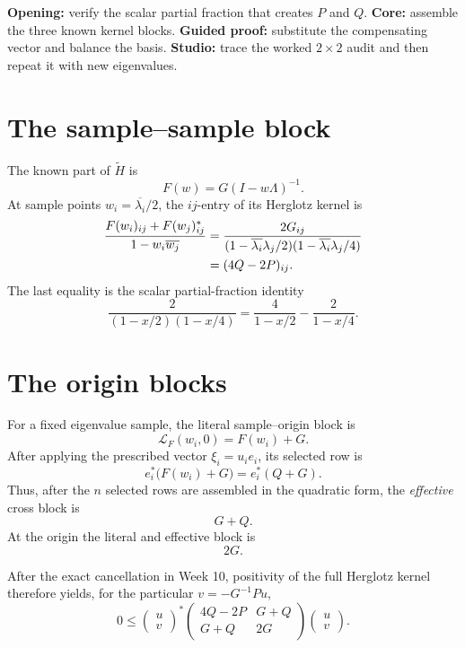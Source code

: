 \documentclass[11pt,oneside,openany]{book}
\theoremstyle{definition}
\theoremstyle{remark}
\begin{document}
\begin{workshopplan}
\textbf{Opening:} verify the scalar partial fraction that creates
\(P\) and \(Q\). \textbf{Core:} assemble the three known kernel
blocks. \textbf{Guided proof:} substitute the compensating vector and
balance the basis. \textbf{Studio:} trace the worked \(2\times2\)
audit and then repeat it with new eigenvalues.
\end{workshopplan}

\section{The sample--sample block}

The known part of \(\widetilde H\) is
\[
  F(w)=G(I-w\Lambda)^{-1}.
\]
At sample points \(w_i=\overline{\lambda_i}/2\), the \(ij\)-entry of
its Herglotz kernel is
\begin{align}
  \frac{F(w_i)_{ij}+F(w_j)^*_{ij}}
       {1-w_i\overline{w_j}}
  &=
  \frac{2G_{ij}}
  {(1-\overline{\lambda_i}\lambda_j/2)
   (1-\overline{\lambda_i}\lambda_j/4)}
  \notag\\
  &=(4Q-2P)_{ij}.
  \label{eq:main-sample-block}
\end{align}
The last equality is the scalar partial-fraction identity
\[
  \frac{2}{(1-x/2)(1-x/4)}
  =\frac{4}{1-x/2}-\frac{2}{1-x/4}.
\]

\section{The origin blocks}

For a fixed eigenvalue sample, the literal sample--origin block is
\[
  \mathcal L_F(w_i,0)=F(w_i)+G.
\]
After applying the prescribed vector \(\xi_i=u_i e_i\), its selected
row is
\[
  e_i^*\bigl(F(w_i)+G\bigr)=e_i^*(Q+G).
\]
Thus, after the \(n\) selected rows are assembled in the quadratic
form, the \emph{effective} cross block is
\begin{equation}
  G+Q.
  \label{eq:cross-block}
\end{equation}
At the origin the literal and effective block is
\begin{equation}
  2G.
  \label{eq:origin-block}
\end{equation}

After the exact cancellation in Week 10, positivity of the full
Herglotz kernel therefore yields, for the particular
\(v=-G^{-1}Pu\),
\begin{equation}
  0\leq
  \begin{pmatrix}u\\v\end{pmatrix}^{\!*}
  \begin{pmatrix}
    4Q-2P&G+Q\\
    G+Q&2G
  \end{pmatrix}
  \begin{pmatrix}u\\v\end{pmatrix}.
  \label{eq:block-quadratic}
\end{equation}
\end{document}

